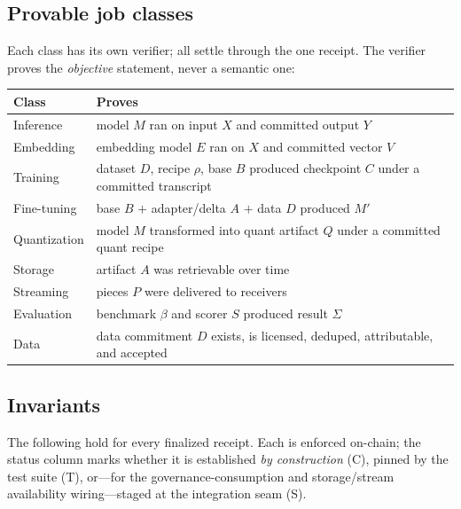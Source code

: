 \subsection{Provable job classes}
\label{sec:rs-jobclasses}

Each class has its own verifier; all settle through the one receipt. The verifier
proves the \emph{objective} statement, never a semantic one:

\begin{center}\small
\begin{tabular}{@{}ll@{}}
\toprule
\textbf{Class} & \textbf{Proves} \\
\midrule
Inference     & model $M$ ran on input $X$ and committed output $Y$ \\
Embedding     & embedding model $E$ ran on $X$ and committed vector $V$ \\
Training      & dataset $D$, recipe $\rho$, base $B$ produced checkpoint $C$ under a committed transcript \\
Fine-tuning   & base $B$ $+$ adapter/delta $A$ $+$ data $D$ produced $M'$ \\
Quantization  & model $M$ transformed into quant artifact $Q$ under a committed quant recipe \\
Storage       & artifact $A$ was retrievable over time \\
Streaming     & pieces $P$ were delivered to receivers \\
Evaluation    & benchmark $\beta$ and scorer $S$ produced result $\Sigma$ \\
Data          & data commitment $D$ exists, is licensed, deduped, attributable, and accepted \\
\bottomrule
\end{tabular}
\end{center}

\subsection{Invariants}
\label{sec:rs-invariants}

The following hold for every finalized receipt. Each is enforced on-chain; the
status column marks whether it is established \emph{by construction} (C), pinned by
the test suite (T), or---for the governance-consumption and storage/stream
availability wiring---staged at the integration seam (S).

